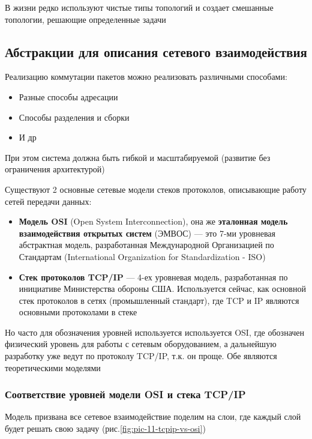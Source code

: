 \documentclass[a4paper]{article}
\begin{document}
В жизни редко используют чистые типы топологий и создает смешанные топологии, решающие определенные задачи

\subsection{Абстракции для описания сетевого взаимодействия}
Реализацию коммутации пакетов можно реализовать различными способами:
\begin{itemize}
	\item Разные способы адресации
	\item Способы разделения и сборки
	\item И др
\end{itemize}

При этом система должна быть гибкой и масштабируемой (развитие без ограничения архитектурой)

Существуют 2 основные сетевые модели стеков протоколов, описывающие работу сетей передачи данных:
\begin{itemize}
	\item \textbf{Модель OSI} (Open System Interconnection), она же \textbf{эталонная модель взаимодействия открытых систем} (ЭМВОС) --- это 7-ми уровневая абстрактная модель, разработанная Международной Организацией по Стандартам (International Organization for Standardization - ISO)
	\item \textbf{Стек протоколов TCP/IP} --- 4-ех уровневая модель, разработанная по инициативе Министерства обороны США. Используется сейчас, как основной стек протоколов в сетях (промышленный стандарт), где TCP и IP являются основными протоколами в стеке
\end{itemize}

Но часто для обозначения уровней используется используется OSI, где обозначен физический уровень для работы с сетевым оборудованием, а дальнейшую разработку уже ведут по протоколу TCP/IP, т.к. он проще. Обе являются теоретическими моделями

\subsubsection{Соответствие уровней модели OSI и стека TCP/IP}
Модель призвана все сетевое взаимодействие поделим на слои, где каждый слой будет решать свою задачу (рис.\ref{fig:pic-11-tcpip-vs-osi})
\end{document}
